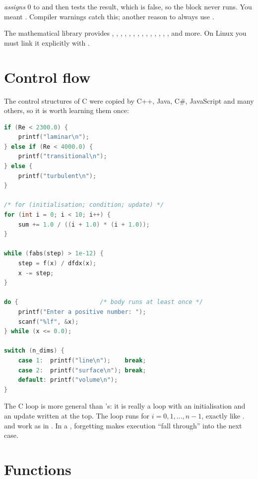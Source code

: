 \begin{pitfall}[Common pitfall: \texttt{=} versus \texttt{==}]
 \emph{assigns} 0 to  and then tests the result, which is
false, so the block never runs. You meant . Compiler warnings catch
this; another reason to always use .
\end{pitfall}

The mathematical library  provides , , ,
, , , , , , ,
, , , ,  and more. On Linux you
must link it explicitly with .

\section{Control flow}

The control structures of C were copied by C++, Java, C\#, JavaScript and many others, so
it is worth learning them once:
\begin{lstlisting}[language=C]
if (Re < 2300.0) {
    printf("laminar\n");
} else if (Re < 4000.0) {
    printf("transitional\n");
} else {
    printf("turbulent\n");
}

/* for (initialisation; condition; update) */
for (int i = 0; i < 10; i++) {
    sum += 1.0 / ((i + 1.0) * (i + 1.0));
}

while (fabs(step) > 1e-12) {
    step = f(x) / dfdx(x);
    x -= step;
}

do {                       /* body runs at least once */
    printf("Enter a positive number: ");
    scanf("%lf", &x);
} while (x <= 0.0);

switch (n_dims) {
    case 1:  printf("line\n");    break;
    case 2:  printf("surface\n"); break;
    default: printf("volume\n");
}
\end{lstlisting}
The C  loop is more general than \py's: it is really a  loop with
an initialisation and an update written at the top. The loop  runs for $i = 0, 1, \ldots, n-1$, exactly like .
 and  work as in \py. In a , forgetting
 makes execution ``fall through'' into the next case.

\section{Functions}

